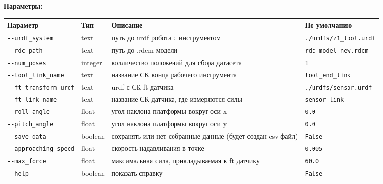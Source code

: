 \textbf{Параметры:}
\begin{center}
\fontsize{10pt}{10pt}\selectfont
\begin{longtable}[]{p{5cm}|p{2cm}|p{3.5cm}|p{5cm}}
    \hline
\toprule()
Параметр & Тип & Описание & По умолчанию \\
\hline
\midrule()
\endhead
\texttt{-\/-urdf\_system} & text & путь до urdf робота с инструментом
&
\texttt{./urdfs/z1\_tool.urdf} \\
\hline
\texttt{-\/-rdc\_path} & text & путь до .rdcm модели &
\texttt{rdc\_model\_new.rdcm} \\
\hline
\texttt{-\/-num\_poses} & integer & колличество положений для сбора датасета &
\texttt{1} \\
\hline
\texttt{-\/-tool\_link\_name} & text & название СК конца рабочего инструмента &
\texttt{tool\_end\_link} \\
\hline
\texttt{-\/-ft\_transform\_urdf} & text & urdf с СК ft датчика &
\texttt{./urdfs/sensor.urdf} \\
\hline
\texttt{-\/-ft\_link\_name} & text & название СК датчика, где измеряются силы &
\texttt{sensor\_link} \\
\hline
\texttt{-\/-roll\_angle} & float & угол наклона платформы вокруг оси x & \texttt{0.0} \\
\hline
\texttt{-\/-pitch\_angle} & float & угол наклона платформы вокруг оси y & \texttt{0.0} \\
\hline
\texttt{-\/-save\_data} & boolean & сохранять или нет собранные данные (будет создан csv файл) & \texttt{False} \\
\hline
\texttt{-\/-approaching\_speed} & float & скорость надавливания в точке & \texttt{0.005} \\
\hline
\texttt{-\/-max\_force} & float & максимальная сила, прикладываемая к ft датчику &
\texttt{60.0} \\
\hline
\texttt{-\/-help} & boolean & показать справку &
\texttt{False} \\
\bottomrule()
\hline
\end{longtable}
\end{center}
